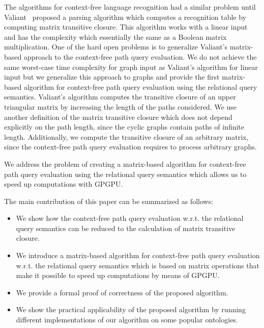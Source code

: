 The algorithms for context-free language recognition had a similar problem until Valiant~\cite{valiant} proposed a parsing algorithm which computes a recognition table by computing matrix transitive closure. This algorithm works with a linear input and has the complexity which essentially the same as a Boolean matrix multiplication. One of the hard open problems is to generalize Valiant's matrix-based approach to the context-free path query evaluation. We do not achieve the same worst-case time complexity for graph input as Valiant's algorithm for linear input but we generalize this approach to graphs and provide the first matrix-based algorithm for context-free path query evaluation using the relational query semantics. Valiant's algorithm computes the transitive closure of an upper triangular matrix by increasing the length of the paths considered. We use another definition of the matrix transitive closure which does not depend explicitly on the path length, since the cyclic graphs contain paths of infinite length. Additionally, we compute the transitive closure of an arbitrary matrix, since the context-free path query evaluation requires to process arbitrary graphs. 

We address the problem of creating a matrix-based algorithm for context-free path query evaluation using the relational query semantics which allows us to speed up computations with GPGPU.

The main contribution of this paper can be summarized as follows:
\begin{itemize}
	\item We show how the context-free path query evaluation w.r.t. the relational query semantics can be reduced to the calculation of matrix transitive closure.
	\item We introduce a matrix-based algorithm for context-free path query evaluation w.r.t. the relational query semantics which is based on matrix operations that make it possible to speed up computations by means of GPGPU.
	\item We provide a formal proof of correctness of the proposed algorithm.
	\item We show the practical applicability of the proposed algorithm by running different implementations of our algorithm on some popular ontologies.
\end{itemize}
